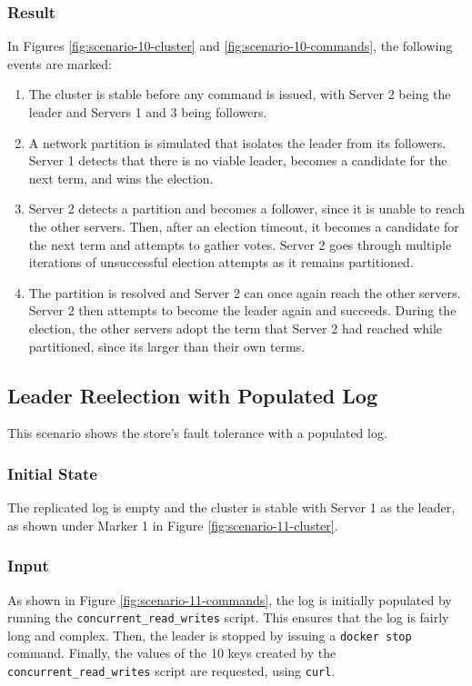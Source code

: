 \subsubsection{Result}
In Figures \ref{fig:scenario-10-cluster} and \ref{fig:scenario-10-commands}, the following events are marked:
\begin{enumerate}
    \item The cluster is stable before any command is issued, with Server 2 being the leader and Servers 1 and 3 being followers.
    \item A network partition is simulated that isolates the leader from its followers. Server 1 detects that there is no viable leader, becomes a candidate for the next term, and wins the election.
    \item Server 2 detects a partition and becomes a follower, since it is unable to reach the other servers. Then, after an election timeout, it becomes a candidate for the next term and attempts to gather votes. Server 2 goes through multiple iterations of unsuccessful election attempts as it remains partitioned.
    \item The partition is resolved and Server 2 can once again reach the other servers. Server 2 then attempts to become the leader again and succeeds. During the election, the other servers adopt the term that Server 2 had reached while partitioned, since its larger than their own terms. 
\end{enumerate}

\subsection{Leader Reelection with Populated Log}

This scenario shows the store's fault tolerance with a populated log.

\subsubsection{Initial State}
The replicated log is empty and the cluster is stable with Server 1 as the leader, as shown under Marker 1 in Figure \ref{fig:scenario-11-cluster}.

\subsubsection{Input}
As shown in Figure \ref{fig:scenario-11-commands}, the log is initially populated by running the \lstinline{concurrent_read_writes} script. This ensures that the log is fairly long and complex. Then, the leader is stopped by issuing a \lstinline{docker stop} command. Finally, the values of the 10 keys created by the \lstinline{concurrent_read_writes} script are requested, using \lstinline{curl}.

